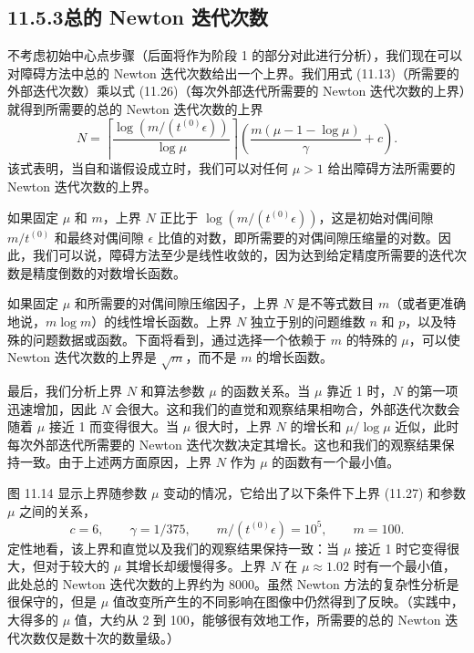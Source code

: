 \documentclass[UTF8, 12pt, fontset=fandol, oneside]{ctexart}
\begin{document}
\subsection*{11.5.3\quad 总的 Newton 迭代次数}

不考虑初始中心点步骤（后面将作为阶段 1 的部分对此进行分析），我们现在可以对障碍方法中总的 Newton 迭代次数给出一个上界。我们用式 (11.13)（所需要的外部迭代次数）乘以式 (11.26)（每次外部迭代所需要的 Newton 迭代次数的上界）就得到所需要的总的 Newton 迭代次数的上界
\begin{equation}
N=\left\lceil\frac{\log(m/(t^{(0)}\epsilon))}{\log\mu}\right\rceil
\left(\frac{m(\mu-1-\log\mu)}{\gamma}+c\right).
\tag{11.27}
\end{equation}
该式表明，当自和谐假设成立时，我们可以对任何 $\mu>1$ 给出障碍方法所需要的 Newton 迭代次数的上界。

如果固定 $\mu$ 和 $m$，上界 $N$ 正比于 $\log(m/(t^{(0)}\epsilon))$，这是初始对偶间隙 $m/t^{(0)}$ 和最终对偶间隙 $\epsilon$ 比值的对数，即所需要的对偶间隙压缩量的对数。因此，我们可以说，障碍方法至少是线性收敛的，因为达到给定精度所需要的迭代次数是精度倒数的对数增长函数。

如果固定 $\mu$ 和所需要的对偶间隙压缩因子，上界 $N$ 是不等式数目 $m$（或者更准确地说，$m\log m$）的线性增长函数。上界 $N$ 独立于别的问题维数 $n$ 和 $p$，以及特殊的问题数据或函数。下面将看到，通过选择一个依赖于 $m$ 的特殊的 $\mu$，可以使 Newton 迭代次数的上界是 $\sqrt{m}$，而不是 $m$ 的增长函数。

最后，我们分析上界 $N$ 和算法参数 $\mu$ 的函数关系。当 $\mu$ 靠近 1 时，$N$ 的第一项迅速增加，因此 $N$ 会很大。这和我们的直觉和观察结果相吻合，外部迭代次数会随着 $\mu$ 接近 1 而变得很大。当 $\mu$ 很大时，上界 $N$ 的增长和 $\mu/\log\mu$ 近似，此时每次外部迭代所需要的 Newton 迭代次数决定其增长。这也和我们的观察结果保持一致。由于上述两方面原因，上界 $N$ 作为 $\mu$ 的函数有一个最小值。

图 11.14 显示上界随参数 $\mu$ 变动的情况，它给出了以下条件下上界 (11.27) 和参数 $\mu$ 之间的关系，
\[
c=6,\qquad \gamma=1/375,\qquad m/(t^{(0)}\epsilon)=10^5,\qquad m=100.
\]
定性地看，该上界和直觉以及我们的观察结果保持一致：当 $\mu$ 接近 1 时它变得很大，但对于较大的 $\mu$ 其增长却缓慢得多。上界 $N$ 在 $\mu\approx 1.02$ 时有一个最小值，此处总的 Newton 迭代次数的上界约为 8000。虽然 Newton 方法的复杂性分析是很保守的，但是 $\mu$ 值改变所产生的不同影响在图像中仍然得到了反映。（实践中，大得多的 $\mu$ 值，大约从 2 到 100，能够很有效地工作，所需要的总的 Newton 迭代次数仅是数十次的数量级。）
\end{document}
